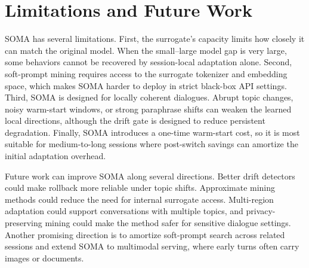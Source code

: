 \section{Limitations and Future Work}
\label{sec:limitations}

SOMA has several limitations. First, the surrogate's capacity limits how closely it can match the original model. When the small--large model gap is very large, some behaviors cannot be recovered by session-local adaptation alone. Second, soft-prompt mining requires access to the surrogate tokenizer and embedding space, which makes SOMA harder to deploy in strict black-box API settings. Third, SOMA is designed for locally coherent dialogues. Abrupt topic changes, noisy warm-start windows, or strong paraphrase shifts can weaken the learned local directions, although the drift gate is designed to reduce persistent degradation. Finally, SOMA introduces a one-time warm-start cost, so it is most suitable for medium-to-long sessions where post-switch savings can amortize the initial adaptation overhead. 

Future work can improve SOMA along several directions. Better drift detectors could make rollback more reliable under topic shifts. Approximate mining methods could reduce the need for internal surrogate access. Multi-region adaptation could support conversations with multiple topics, and privacy-preserving mining could make the method safer for sensitive dialogue settings. Another promising direction is to amortize soft-prompt search across related sessions and extend SOMA to multimodal serving, where early turns often carry images or documents.